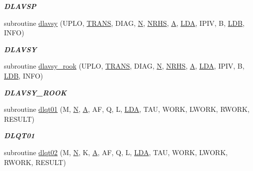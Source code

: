 \begin{DoxyCompactItemize}
\begin{DoxyCompactList}\small\item\em {\bfseries D\+L\+A\+V\+S\+P} \end{DoxyCompactList}\item 
subroutine \hyperlink{group__double__lin_ga3eae501df53eca1113cb9703e237acd3}{dlavsy} (U\+P\+L\+O, \hyperlink{superlu__enum__consts_8h_a0c4e17b2d5cea33f9991ccc6a6678d62a1f61e3015bfe0f0c2c3fda4c5a0cdf58}{T\+R\+A\+N\+S}, D\+I\+A\+G, \hyperlink{polmisc_8c_a0240ac851181b84ac374872dc5434ee4}{N}, \hyperlink{example__user_8c_aa0138da002ce2a90360df2f521eb3198}{N\+R\+H\+S}, \hyperlink{classA}{A}, \hyperlink{example__user_8c_ae946da542ce0db94dced19b2ecefd1aa}{L\+D\+A}, I\+P\+I\+V, B, \hyperlink{example__user_8c_a50e90a7104df172b5a89a06c47fcca04}{L\+D\+B}, I\+N\+F\+O)
\begin{DoxyCompactList}\small\item\em {\bfseries D\+L\+A\+V\+S\+Y} \end{DoxyCompactList}\item 
subroutine \hyperlink{group__double__lin_ga30758da2bab16da4b0b5c925bc869022}{dlavsy\+\_\+rook} (U\+P\+L\+O, \hyperlink{superlu__enum__consts_8h_a0c4e17b2d5cea33f9991ccc6a6678d62a1f61e3015bfe0f0c2c3fda4c5a0cdf58}{T\+R\+A\+N\+S}, D\+I\+A\+G, \hyperlink{polmisc_8c_a0240ac851181b84ac374872dc5434ee4}{N}, \hyperlink{example__user_8c_aa0138da002ce2a90360df2f521eb3198}{N\+R\+H\+S}, \hyperlink{classA}{A}, \hyperlink{example__user_8c_ae946da542ce0db94dced19b2ecefd1aa}{L\+D\+A}, I\+P\+I\+V, B, \hyperlink{example__user_8c_a50e90a7104df172b5a89a06c47fcca04}{L\+D\+B}, I\+N\+F\+O)
\begin{DoxyCompactList}\small\item\em {\bfseries D\+L\+A\+V\+S\+Y\+\_\+\+R\+O\+O\+K} \end{DoxyCompactList}\item 
subroutine \hyperlink{group__double__lin_ga232d99672dedb88a49b1abd4b77191ec}{dlqt01} (M, \hyperlink{polmisc_8c_a0240ac851181b84ac374872dc5434ee4}{N}, \hyperlink{classA}{A}, A\+F, Q, L, \hyperlink{example__user_8c_ae946da542ce0db94dced19b2ecefd1aa}{L\+D\+A}, T\+A\+U, W\+O\+R\+K, L\+W\+O\+R\+K, R\+W\+O\+R\+K, R\+E\+S\+U\+L\+T)
\begin{DoxyCompactList}\small\item\em {\bfseries D\+L\+Q\+T01} \end{DoxyCompactList}\item 
subroutine \hyperlink{group__double__lin_gac1d9da2b1a845ba9ad779f2ed0360faf}{dlqt02} (M, \hyperlink{polmisc_8c_a0240ac851181b84ac374872dc5434ee4}{N}, K, \hyperlink{classA}{A}, A\+F, Q, L, \hyperlink{example__user_8c_ae946da542ce0db94dced19b2ecefd1aa}{L\+D\+A}, T\+A\+U, W\+O\+R\+K, L\+W\+O\+R\+K, R\+W\+O\+R\+K, R\+E\+S\+U\+L\+T)

\end{DoxyCompactItemize}
